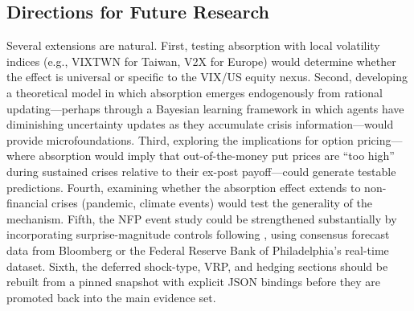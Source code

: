 \documentclass[12pt,a4paper]{article}
\begin{document}
\subsection{Directions for Future Research}

Several extensions are natural. First, testing absorption with local volatility indices (e.g., VIXTWN for Taiwan, V2X for Europe) would determine whether the effect is universal or specific to the VIX/US equity nexus. Second, developing a theoretical model in which absorption emerges endogenously from rational updating---perhaps through a Bayesian learning framework in which agents have diminishing uncertainty updates as they accumulate crisis information---would provide microfoundations. Third, exploring the implications for option pricing---where absorption would imply that out-of-the-money put prices are ``too high'' during sustained crises relative to their ex-post payoff---could generate testable predictions. Fourth, examining whether the absorption effect extends to non-financial crises (pandemic, climate events) would test the generality of the mechanism. Fifth, the NFP event study could be strengthened substantially by incorporating surprise-magnitude controls following \citet{andersen2003}, using consensus forecast data from Bloomberg or the Federal Reserve Bank of Philadelphia's real-time dataset. Sixth, the deferred shock-type, VRP, and hedging sections should be rebuilt from a pinned snapshot with explicit JSON bindings before they are promoted back into the main evidence set.

\newpage
\end{document}
